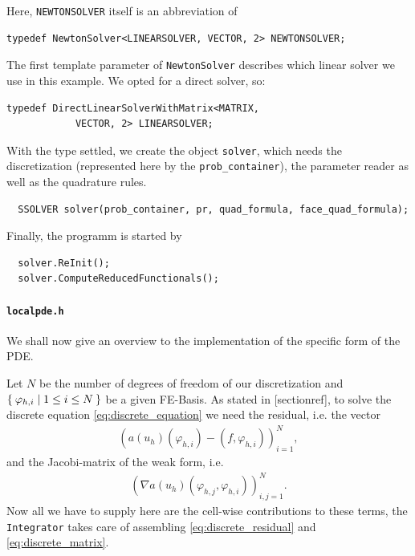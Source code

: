 \documentclass[prodmode,acmtoms]{acmsmall}
\numberwithin{equation}{section}
\renewcommand{\phi}{\varphi}
\begin{document}
Here, \texttt{NEWTONSOLVER} itself is an abbreviation of
\begin{lstlisting}
typedef NewtonSolver<LINEARSOLVER, VECTOR, 2> NEWTONSOLVER;
\end{lstlisting}
The first template parameter of \texttt{NewtonSolver} describes which linear solver we use in this example. We opted for a direct solver, so: 
\begin{lstlisting}
typedef DirectLinearSolverWithMatrix<MATRIX,
            VECTOR, 2> LINEARSOLVER;
\end{lstlisting}
With the type settled, we create the object \texttt{solver}, which needs the discretization (represented here by the \texttt{prob\_container}), the parameter reader as well as the quadrature rules.
\begin{lstlisting}
  SSOLVER solver(prob_container, pr, quad_formula, face_quad_formula);
\end{lstlisting}
Finally, the programm is started by
\begin{lstlisting}
  solver.ReInit();
  solver.ComputeReducedFunctionals();
\end{lstlisting}

\paragraph{\texttt{localpde.h}}
We shall now give an overview to the implementation of the specific form of the PDE. 

Let $N$ be the number of degrees of freedom of our discretization and $\Set{\phi_{h,i}|1\leq i \leq N}$ be a given FE-Basis. As stated in [sectionref], to solve the discrete equation \eqref{eq:discrete_equation} we need the residual, i.e. the vector
\begin{align}\label{eq:discrete_residual}
\left(a(u_h)(\phi_{h,i})-(f,\phi_{h,i})\right)_{i=1}^N,
\end{align}
and the Jacobi-matrix of the weak form, i.e.
\begin{align}\label{eq:discrete_matrix}
\left(\nabla a(u_h)(\phi_{h,j},\phi_{h,i})\right)_{i,j=1}^N.
\end{align}
Now all we have to supply here are the cell-wise contributions to these terms, the \texttt{Integrator} takes care of assembling \eqref{eq:discrete_residual} and \eqref{eq:discrete_matrix}.
\end{document}
